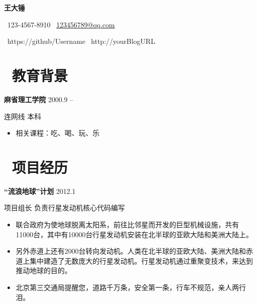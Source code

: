 \documentclass[11pt]{article}
\begin{document}
	
%

\centerline{\LARGE\bfseries{王大锤}}

\centerline{\normalsize{\faPhone\ 123-4567-8910 \quad \faEnvelopeO\ \href{mailto:123456789@qq.com}{123456789@qq.com}}}

\centerline{\normalsize{\faGithub\ https://github/Username \quad \faRssSquare \ http://yourBlogURL}}
	
\section{\makebox[\widthof{\faGraduationCap}][c]{\color{CVBlue}\faGraduationCap}\  教育背景}	
\textbf{麻省理工学院} \hfill 2000.9 -- 

连网线 \quad 本科
\begin{itemize}
	\item 相关课程：吃、喝、玩、乐
\end{itemize}

\section{\makebox[\widthof{\faGraduationCap}][c]{\color{CVBlue}\faUsers}\ 项目经历}
\textbf{“流浪地球”计划} \hfill 2012.1

项目组长 \quad 负责行星发动机核心代码编写
\begin{itemize}
	\item 联合政府为使地球脱离太阳系，前往比邻星而开发的巨型机械设施，共有11000台，其中有10000台行星发动机安装在北半球的亚欧大陆和美洲大陆上。
	\item 另外赤道上还有2000台转向发动机。人类在北半球的亚欧大陆、美洲大陆和赤道上集中建造了无数庞大的行星发动机。行星发动机通过重聚变技术，来达到推动地球的目的。
	\item 北京第三交通局提醒您，道路千万条，安全第一条，行车不规范，亲人两行泪。
\end{itemize}
	
\end{document}
